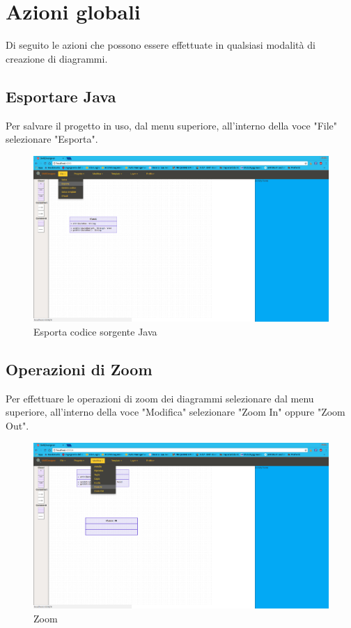 \section{Azioni globali}
Di seguito le azioni che possono essere effettuate in qualsiasi modalità di creazione di diagrammi.

\subsection{Esportare Java}
Per salvare il progetto in uso, dal menu superiore, all'interno della voce "File" selezionare "Esporta".
\begin{figure}[h!]
	\centering
		\includegraphics[scale=1]{../img/esporta.png}
	\caption{Esporta codice sorgente Java}
\end{figure}

\newpage

\subsection{Operazioni di Zoom}
Per effettuare le operazioni di zoom dei diagrammi selezionare dal menu superiore, all'interno della voce "Modifica" selezionare "Zoom In" oppure "Zoom Out".
\begin{figure}[h!]
	\centering
		\includegraphics[scale=1]{../img/Zoom.png}
	\caption{Zoom}
\end{figure}
\newpage

